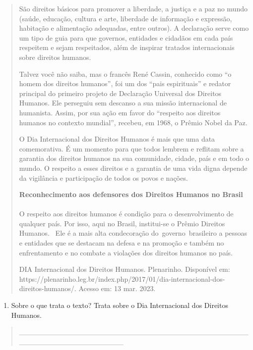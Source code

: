 \begin{itemize}
{{{\begin{itemize}
\begin{itemize}
\begin{itemize}
\begin{quote}
São direitos básicos para promover a liberdade, a justiça e a paz no
mundo (saúde, educação, cultura e arte, liberdade de informação e
expressão, habitação e alimentação adequadas, entre outros). A
declaração serve como um tipo de guia para que governos, entidades e
cidadãos em cada país respeitem e sejam respeitados, além de inspirar
tratados internacionais sobre direitos humanos.

Talvez você não saiba, mas o francês René Cassin, conhecido como ``o
homem dos direitos humanos'', foi um dos ``pais espirituais'' e redator
principal do primeiro projeto de Declaração Universal dos Direitos
Humanos. Ele perseguiu sem descanso a sua missão internacional de
humanista. Assim, por sua ação em favor do ``respeito aos direitos
humanos no contexto mundial'', recebeu, em 1968, o Prêmio Nobel da Paz.

O Dia Internacional dos Direitos Humanos é mais que uma data
comemorativa. É um momento para que todos lembrem e reflitam sobre a
garantia dos direitos humanos na sua comunidade, cidade, país e em todo
o mundo. O respeito a esses direitos e a garantia de uma vida digna
depende da vigilância e participação de todos os povos e nações.

\textbf{Reconhecimento aos defensores dos Direitos Humanos no Brasil\\
}\\
O respeito aos direitos humanos é condição para o desenvolvimento de
qualquer país. Por isso, aqui no Brasil, institui-se o Prêmio Direitos
Humanos. ~Ele é a mais alta condecoração do~governo~brasileiro a pessoas
e entidades que se destacam na defesa e na promoção e também no
enfrentamento e no combate a violações dos direitos humanos no país.

DIA Internacional dos Direitos Humanos. Plenarinho. Disponível em:
https://plenarinho.leg.br/index.php/2017/01/dia-internacional-dos-direitos-humanos/.
Acesso em: 13 mar. 2023.
\end{quote}

\begin{enumerate}
\def\labelenumi{\alph{enumi})}
\item
  Sobre o que trata o texto? Trata sobre o Dia Internacional dos
  Direitos Humanos.
\end{enumerate}

\begin{quote}
\_\_\_\_\_\_\_\_\_\_\_\_\_\_\_\_\_\_\_\_\_\_\_\_\_\_\_\_\_\_\_\_\_\_\_\_\_\_\_\_\_\_\_\_\_\_\_\_\_\_\_\_\_\_\_\_\_\_\_\_\_\_\_\_


\end{quote}
\end{itemize}
\end{itemize}
\end{itemize}}}}
\end{itemize}
